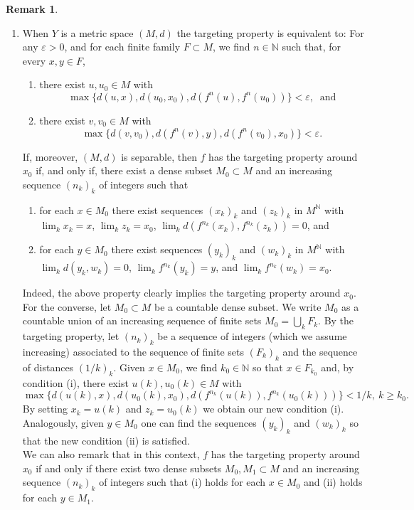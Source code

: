 \documentclass[12pt,english]{amsart}
\numberwithin{equation}{section}
\theoremstyle{plain}
\theoremstyle{definition}
\newtheorem{remark}[theorem]{Remark}
\def\NN{\mathbb N}
\begin{document}
\begin{remark}
\begin{enumerate}
\item[(b)] When $Y$ is a metric space $(M,d)$ the targeting property is equivalent to: For any $\varepsilon>0$, and for each finite family $F\subset M$, we find $n\in \NN$ such that, for every $x,y\in F$,   
\begin{enumerate}
\item[(i)]  there exist $u,u_0\in M$ with 
\[
\max \{d(u,x),d(u_0,x_0),d(f^n(u),f^n(u_0))\} <\varepsilon, \ \mbox{ and}
\]
\item[(ii)] there exist $v,v_0\in M$ with 
\[
\max \{d(v,v_0),d(f^n(v),y),d(f^n(v_0),x_0)\} <\varepsilon.  
\] 
\end{enumerate}
    If, moreover, $(M,d)$ is separable, then $f$ has the targeting property around $x_0$ if, and only if, there exist a dense subset $M_0\subset M$ and an increasing sequence $(n_k)_k$ of integers such that
    \begin{enumerate}
\item[(i)]  for each $x\in M_0$ there exist sequences $(x_k)_k$ and $(z_k)_k$ in $M^\NN$  with $\lim_k x_k=x$, $\lim_kz_k=x_0$, $\lim_k d(f^{n_k}(x_k),f^{n_k}(z_k))=0$, and 
\item[(ii)] for each $y\in M_0$ there exist sequences $(y_k)_k$ and $(w_k)_k$ in $M^\NN$  with $\lim_k d(y_k,w_k)=0$,  $\lim_kf^{n_k}(y_k)=y$, and $\lim_k f^{n_k}(w_k)=x_0$. 
\end{enumerate}
Indeed, the above property clearly implies the targeting property around $x_0$. For the converse, let $M_0\subset M$ be a countable dense subset. We write $M_0$ as a countable union of an increasing sequence of finite sets $M_0=\bigcup_k F_k$. By the targeting property, let $(n_k)_k$ be a sequence of integers (which we assume increasing) associated to the sequence of finite sets $(F_k)_k$ and the sequence of distances $(1/k)_k$. Given $x\in M_0$, we find $k_0\in\NN$ so that $x\in F_{k_0}$ and, by condition (i), there exist $u(k),u_0(k)\in M$ with 
\[
\max \{d(u(k),x),d(u_0(k),x_0),d(f^{n_k}(u(k)),f^{n_k}(u_0(k)))\} <1/k, \ k\geq k_0.
\]
By setting $x_k=u(k)$ and $z_k=u_0(k)$ we obtain our new condition (i). Analogously, given $y\in M_0$ one can find the sequences $(y_k)_k$ and $(w_k)_k$ so that the new condition (ii) is satisfied.\\
We can also remark that in this context, $f$ has the targeting property around $x_0$ if and only if there exist two dense subsets $M_0,M_1\subset M$ and an increasing sequence $(n_k)_k$ of integers such that (i) holds for each $x\in M_0$ and (ii) holds for each $y\in M_1$.

\end{enumerate}
\end{remark}
\end{document}
